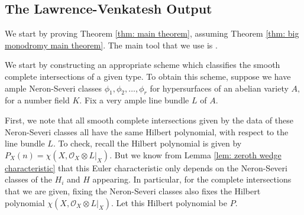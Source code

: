 \documentclass{article}
\newtheorem{thm}{Theorem}[section]
\theoremstyle{definition}
\theoremstyle{remark}
\DeclareMathOperator{\Spec}{Spec}
\begin{document}
\subsection{The Lawrence-Venkatesh Output}
We start by proving Theorem \ref{thm: main theorem}, assuming Theorem \ref{thm: big monodromy main theorem}. The main tool that we use is \cite[Theorem D]{km24}.
\par We start by constructing an appropriate scheme which classifies the smooth complete intersections of a given type. To obtain this scheme, suppose we have ample Neron-Severi classes $\phi_1, \phi_2, \ldots, \phi_r$ for hypersurfaces of an abelian variety $A,$ for a number field $K.$ Fix a very ample line bundle $L$ of $A.$
\par First, we note that all smooth complete intersections given by the data of these Neron-Severi classes all have the same Hilbert polynomial, with respect to the line bundle $L.$ To check, recall the Hilbert polynomial is given by $P_X(n) = \chi(X, \mathcal{O}_{X} \otimes L|_X).$ But we know from Lemma \ref{lem: zeroth wedge characteristic} that this Euler characteristic only depends on the Neron-Severi classes of the $H_i$ and $H$ appearing. In particular, for the complete intersections that we are given, fixing the Neron-Severi classes also fixes the Hilbert polynomial $\chi(X, \mathcal{O}_{X} \otimes L|_X).$ Let this Hilbert polynomial be $P.$
\end{document}
